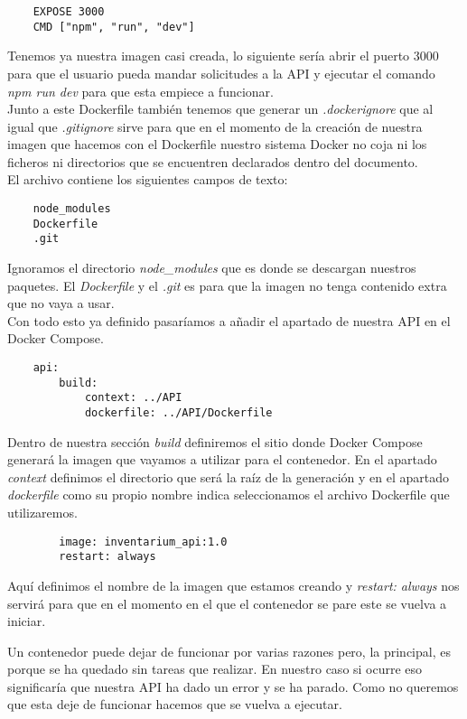 \begin{verbatim}
    EXPOSE 3000
    CMD ["npm", "run", "dev"]
\end{verbatim}
Tenemos ya nuestra imagen casi creada, lo siguiente sería abrir el puerto 3000 para que el usuario pueda mandar solicitudes a la API y ejecutar el comando \textit{npm run dev} para que esta empiece a funcionar.
\\Junto a este Dockerfile también tenemos que generar un \textit{.dockerignore} que al igual que \textit{.gitignore} sirve para que en el momento de la creación de nuestra imagen que hacemos con el Dockerfile nuestro sistema Docker no coja ni los ficheros ni directorios que se encuentren declarados dentro del documento.
\\El archivo contiene los siguientes campos de texto:
\begin{verbatim}
    node_modules
    Dockerfile
    .git
\end{verbatim}
Ignoramos el directorio \textit{node\_modules} que es donde se descargan nuestros paquetes. El \textit{Dockerfile} y el \textit{.git} es para que la imagen no tenga contenido extra que no vaya a usar.
\vspace{\baselineskip}
\\Con todo esto ya definido pasaríamos a añadir el apartado de nuestra API en el Docker Compose.
\begin{verbatim}
    api:
        build:
            context: ../API
            dockerfile: ../API/Dockerfile
\end{verbatim}
Dentro de nuestra sección \textit{build} definiremos el sitio donde Docker Compose generará la imagen que vayamos a utilizar para el contenedor. En el apartado \textit{context} definimos el directorio que será la raíz de la generación y en el apartado \textit{dockerfile} como su propio nombre indica seleccionamos el archivo Dockerfile que utilizaremos.
\begin{verbatim}
        image: inventarium_api:1.0
        restart: always
\end{verbatim}
Aquí definimos el nombre de la imagen que estamos creando y \textit{restart: always} nos servirá para que en el momento en el que el contenedor se pare este se vuelva a iniciar.
\begin{tcolorbox}
    [colback=green!5!white,colframe=green!75!black,fonttitle=\bfseries,title=¿Cuándo se para un contenedor?]
    Un contenedor puede dejar de funcionar por varias razones pero, la principal, es porque se ha quedado sin tareas que realizar. En nuestro caso si ocurre eso significaría que nuestra API ha dado un error y se ha parado. Como no queremos que esta deje de funcionar hacemos que se vuelva a ejecutar.
\end{tcolorbox}
